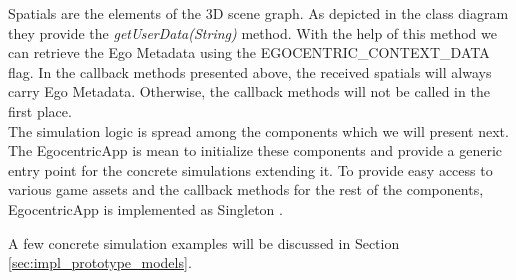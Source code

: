 Spatials are the elements of the 3D scene graph. As depicted in the class diagram they provide the \emph{getUserData(String)} method. With the help of this method we can retrieve the Ego Metadata using the EGOCENTRIC\_CONTEXT\_DATA flag. In the callback methods presented above, the received spatials will always carry Ego Metadata. Otherwise, the callback methods will not be called in the first place.\\

The simulation logic is spread among the components which we will present next. The EgocentricApp is mean to initialize these components and provide a generic entry point for the concrete simulations extending it. To provide easy access to various game assets and the callback methods for the rest of the components, EgocentricApp is implemented as Singleton \cite{gamma1994design}.

A few concrete simulation examples will be discussed in Section \ref{sec:impl_prototype_models}.
